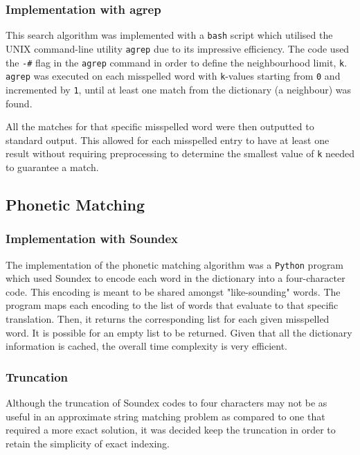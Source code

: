 \documentclass[11pt]{article}
\begin{document}
\subsubsection{Implementation with agrep}
This search algorithm was implemented with a \texttt{bash} script which utilised the UNIX command-line utility \texttt{agrep}  %
 due to its impressive efficiency. The code used the \texttt{-\#} flag in the \texttt{agrep} command in order to define the neighbourhood limit, \texttt{k}. \texttt{agrep} was executed on each misspelled word with \texttt{k}-values starting from \texttt{0} and incremented by \texttt{1}, until at least one match from the dictionary (a neighbour) was found.

All the matches for that specific misspelled word were then outputted to standard output. This allowed for each misspelled entry to have at least one result without requiring preprocessing to determine the smallest value of \texttt{k} needed to guarantee a match.


\subsection{Phonetic Matching}


\subsubsection{Implementation with Soundex}
The implementation of the phonetic matching algorithm was a \texttt{Python} program which used Soundex
to encode each word in the dictionary into a four-character code. This encoding is meant to be shared amongst "like-sounding" words. %
The program maps each encoding to the list of words that evaluate to that specific translation. Then, it returns the corresponding list for each given misspelled word. It is possible for an empty list to be returned. Given that all the dictionary information is cached, the overall time complexity is very efficient.

\subsubsection{Truncation}
Although the truncation of Soundex codes to four characters may not be as useful in an approximate string matching problem as compared to one that required a more exact solution, it was decided keep the truncation in order to retain the simplicity of exact indexing. 
\end{document}
